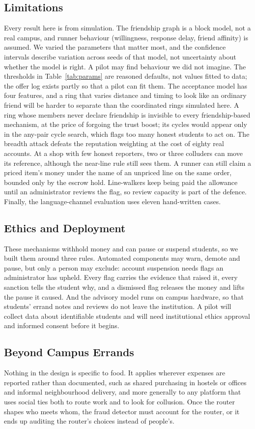 \subsection{Limitations}
Every result here is from simulation. The friendship graph is a block model, not a
real campus, and runner behaviour (willingness, response delay, friend affinity) is
assumed. We varied the parameters that matter most, and the confidence intervals
describe variation across seeds of that model, not uncertainty about whether the
model is right. A pilot may find behaviour we did not imagine. The thresholds in
Table~\ref{tab:params} are reasoned defaults, not values fitted to data; the offer log
exists partly so that a pilot can fit them. The acceptance model has four features,
and a ring that varies distance and timing to look like an ordinary friend will be
harder to separate than the coordinated rings simulated here. A ring whose members
never declare friendship is invisible to every friendship-based mechanism, at the
price of forgoing the trust boost; its cycles would appear only in the any-pair cycle
search, which flags too many honest students to act on. The breadth attack defeats the
reputation weighting at the cost of eighty real accounts. At a shop with few honest
reporters, two or three colluders can move its reference, although the near-line rule
still sees them. A runner can still claim a priced item's money under the name of an
unpriced line on the same order, bounded only by the escrow hold. Line-walkers keep
being paid the allowance until an administrator reviews the flag, so review capacity
is part of the defence. Finally, the language-channel evaluation uses eleven
hand-written cases.

\subsection{Ethics and Deployment}
These mechanisms withhold money and can pause or suspend students, so we built them
around three rules. Automated components may warn, demote and pause, but only a person
may exclude: account suspension needs flags an administrator has upheld. Every flag
carries the evidence that raised it, every sanction tells the student why, and a
dismissed flag releases the money and lifts the pause it caused. And the advisory
model runs on campus hardware, so that students' errand notes and reviews do not
leave the institution. A pilot will collect data about identifiable students and will
need institutional ethics approval and informed consent before it begins.

\subsection{Beyond Campus Errands}
Nothing in the design is specific to food. It applies wherever expenses are reported
rather than documented, such as shared purchasing in hostels or offices and informal
neighbourhood delivery, and more generally to any platform that uses social ties both
to route work and to look for collusion. Once the router shapes who meets whom, the
fraud detector must account for the router, or it ends up auditing the router's
choices instead of people's.
